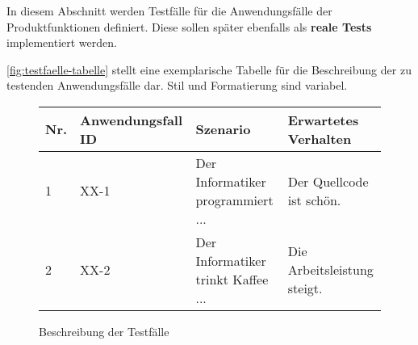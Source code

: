 \begin{tcolorbox}
In diesem Abschnitt werden Testfälle für die Anwendungsfälle der Produktfunktionen definiert.
Diese sollen später ebenfalls als \textbf{reale Tests} implementiert werden.

\autoref{fig:testfaelle-tabelle} stellt eine exemplarische Tabelle für die Beschreibung der zu testenden Anwendungsfälle dar. 
Stil und Formatierung sind variabel.
\end{tcolorbox}

\begin{figure}[!h]
	\begin{center}
		\begin{tabularx}{\textwidth}{ p{} | p{} | p{} | X }
			\textbf{Nr.} & \textbf{Anwendungsfall ID} & \textbf{Szenario} & \textbf{Erwartetes Verhalten} \\ \hline
			1 & XX-1 & Der Informatiker programmiert ... & Der Quellcode ist schön.\\ \hline
			2 & XX-2 & Der Informatiker trinkt Kaffee ... & Die Arbeitsleistung steigt.
		\end{tabularx}	
	\end{center}
	\caption{Beschreibung der Testfälle}
	\label{fig:testfaelle-tabelle}
\end{figure}

